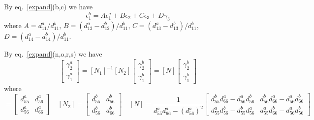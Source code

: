 \documentclass{article}
\begin{document}
By eq.~\ref{expand}(b,c) we have
\begin{equation}
\epsilon_1^b = A\epsilon_1^a + B\epsilon_2 + C\epsilon_3 + D\gamma_3
\label{s1}
\end{equation}
where $A=d_{11}^a/d_{11}^b$, $B=(d_{12}^a-d_{12}^b)/d_{11}^b$, $C=(d_{13}^a-d_{13}^b)/d_{11}^b$, $D=(d_{14}^a-d_{14}^b)/d_{11}^b$.

By eq.~\ref{expand}(n,o,r,s) we have
\begin{equation}
\begin{bmatrix}
    \gamma_2^a \\ \gamma_1^a 
  \end{bmatrix}
  = [N_1]^{-1}[N_2]
  \begin{bmatrix}
    \gamma_2^b \\ \gamma_1^b  
  \end{bmatrix}
  =[N]
    \begin{bmatrix}
      \gamma_2^b \\ \gamma_1^b  
    \end{bmatrix}
\label{s2}
\end{equation}
where 
\begin{equation*}
[N_1] = 
	\begin{bmatrix}
      d_{55}^a & d_{56}^a\\ d_{56}^a & d_{66}^a 
    \end{bmatrix}
    \quad
[N_2] = 
	\begin{bmatrix}
      d_{55}^b & d_{56}^b\\ d_{56}^b & d_{66}^b 
    \end{bmatrix}
    \quad  
[N] = \frac{1}{d_{55}^a d_{66}^a - (d_{56}^a)^2} 
	\begin{bmatrix}
     d_{55}^b d_{66}^a - d_{56}^a d_{56}^b &  d_{56}^b d_{66}^a - d_{56}^a d_{66}^b \\ 
     d_{55}^a d_{56}^b - d_{55}^b d_{56}^a &  d_{55}^a d_{66}^b - d_{56}^a d_{56}^b 
    \end{bmatrix}
\end{equation*}
\end{document}
